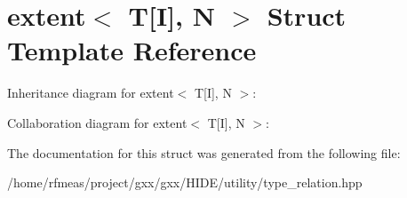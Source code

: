 \hypertarget{structextent_3_01T[I]_00_01N_01_4}{}\section{extent$<$ T\mbox{[}I\mbox{]}, N $>$ Struct Template Reference}
\label{structextent_3_01T[I]_00_01N_01_4}


Inheritance diagram for extent$<$ T\mbox{[}I\mbox{]}, N $>$\+:


Collaboration diagram for extent$<$ T\mbox{[}I\mbox{]}, N $>$\+:


The documentation for this struct was generated from the following file\+:\begin{DoxyCompactItemize}
\item 
/home/rfmeas/project/gxx/gxx/\+H\+I\+D\+E/utility/type\+\_\+relation.\+hpp\end{DoxyCompactItemize}
